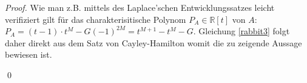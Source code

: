 \documentclass{article}
\theoremstyle{plain} %
\theoremstyle{definition} %
\newtheorem{proof}[theorem]{Beweis}
\begin{document}
\begin{proof}
  Wie man z.B. mittels des Laplace'schen Entwicklungssatzes leicht verifiziert gilt für das charakterisitische Polynom $P_A \in \mathbb{R}[t]$ von $A$: $P_A = (t - 1) \cdot t^M - G (-1)^{2M} = t^{M+1} - t^M - G$. Gleichung \ref{rabbit3} folgt daher direkt aus dem Satz von Cayley-Hamilton\cite[S. 109]{LiesenMehrmann} womit die zu zeigende Aussage bewiesen ist.

  \qed
\end{proof}

% 
% 
\end{document}
